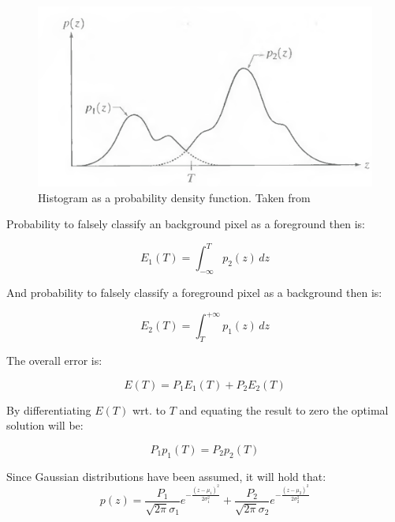 \begin{figure}[htb]
	\begin{center}
		\includegraphics[width=0.8\linewidth]{bilder/Gonzalez.png}
		\caption[Histogram as a probability density function]%
        {Histogram as a probability density function. Taken from \cite{digital_image_book}}\label{fig:gmm}
	\end{center}
\end{figure}

Probability to falsely classify an background pixel as a foreground then is:

\begin{equation}
    E_1(T) = \int_{-\infty}^T{p_2(z) \, dz}
\end{equation}

And probability to falsely classify a foreground pixel as a background then is:

\begin{equation}
    E_2(T) = \int_T^{+\infty}{p_1(z) \, dz}
\end{equation}

The overall error is:

\begin{equation}
    E(T) = P_1E_1(T) + P_2E_2(T)
\end{equation}

By differentiating $E(T)$ wrt. to $T$ and equating the result to zero the optimal solution will be:

\begin{equation}
    P_1p_1(T) = P_2p_2(T)
\end{equation}

Since Gaussian distributions have been assumed, it will hold that:
\begin{equation}
    p(z) = \frac{P_1}{\sqrt{2\pi} \sigma_1}e^{-\frac{(z-\mu_1)^2}{2\sigma_1^2}} + \frac{P_2}{\sqrt{2\pi} \sigma_2}e^{-\frac{(z-\mu_2)^2}{2\sigma_2^2}}
\end{equation}

